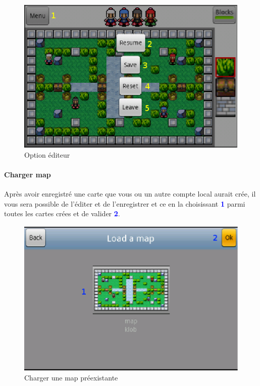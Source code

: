 	\begin{figure}[H]
	\centering
		\includegraphics[scale=0.7]{Manuel/Img/13}
		\caption{Option éditeur}
	\end{figure}
	
	\paragraph{Charger map\\}
	Après avoir enregistré une carte que vous ou un autre compte local aurait crée,
	il vous sera possible de l'éditer et de l'enregistrer et ce en la choisissant
	\textcolor{blue}{\textbf{1}} parmi toutes les cartes crées et de valider
	\textcolor{blue}{\textbf{2}}. \begin{figure}[H]
	\centering
		\includegraphics[scale=0.7]{Manuel/Img/14}
		\caption{Charger une map préexistante}
	\end{figure}
	

